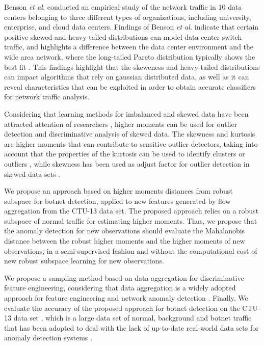 \documentclass[review]{elsarticle}
\begin{document}
Benson \emph{et al.} \cite{benson2010network} conducted an empirical study of the network traffic in 10 data centers belonging to three different types of organizations, including university, enterprise, and cloud data centers. Findings of Benson \emph{et al.} indicate that certain positive skewed and heavy-tailed distributions can model data center switch traffic, and highlights a difference between the data center environment and the wide area network, where the long-tailed Pareto distribution typically shows the best fit \cite{benson2010network}. This findings highlight that the skeweness and heavy-tailed distributions can impact algorithms that rely on gaussian distributed data, as well as it can reveal characteristics that can be exploited in order to obtain accurate classifiers for network traffic analysis. 

Considering that learning methods for imbalanced and skewed data have been attracted attention of researchers \cite{Phua2004minority,hubert2009robustskewed}, higher moments can be used for outlier detection and discriminative analysis of skewed data. The skewness and kurtosis are higher moments that can contribute to sensitive outlier detectors, taking into account that the properties of the kurtosis can be used to identify clusters or outliers \cite{pena2010eigenvectors}, while skewness has been used as adjust factor for outlier detection in skewed data sets \cite{hubert2009robustskewed}.

We propose an approach based on higher moments distances from robust subspace for botnet detection, applied to new features generated by flow aggregation from the CTU-13 data set. The proposed approach relies on a robust subspace of normal traffic for estimating higher moments. Thus, we propose that the anomaly detection for new observations should evaluate the Mahalanobis distance between the robust higher moments and the higher moments of new observations, in a semi-supervised fashion and without the computational cost of new robust subspace learning for new observations. 

We propose a sampling method based on data aggregation for discriminative feature engineering, considering that data aggregation is a widely adopted approach for feature engineering \cite{garcia2014empirical, chandrashekar2014survey,acarali2016survey} and network anomaly detection \cite{lakhina2005mining, callegari2011novel, vieira2017model}. Finally, We evaluate the accuracy of the proposed approach for botnet detection on the CTU-13 data set \cite{garcia2014empirical}, which is a large data set of normal, background and botnet traffic that has been adopted to deal with the lack of up-to-date real-world data sets for anomaly detection systems \cite{osanaiye2016distributed}. 
\end{document}
